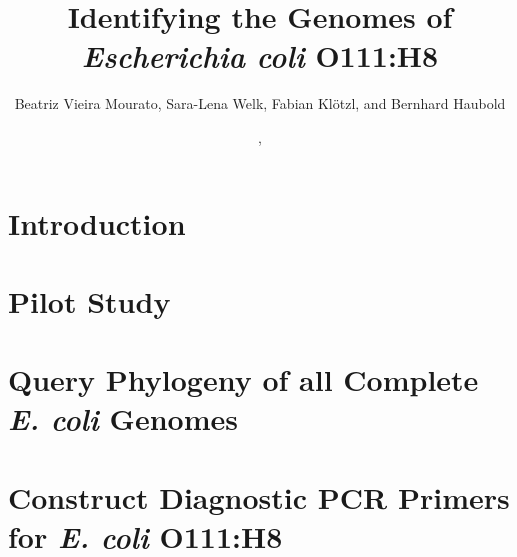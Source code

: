 \documentclass[a4paper]{report}
\title{Identifying the Genomes of \emph{Escherichia coli}
  O111:H8\\\small\ty{github.com/evolbioinf/o111h8}}
\author{Beatriz Vieira Mourato, Sara-Lena Welk, Fabian Klötzl, and Bernhard Haubold}
\date{\!\!, }
\begin{document}
\maketitle
\tableofcontents

\chapter{Introduction}

\chapter{Pilot Study}\label{ch:p}

\chapter{Query Phylogeny of all Complete \emph{E. coli} Genomes}\label{ch:q}

\chapter{Construct Diagnostic PCR Primers for \emph{E. coli} O111:H8}\label{ch:m}



\end{document}
